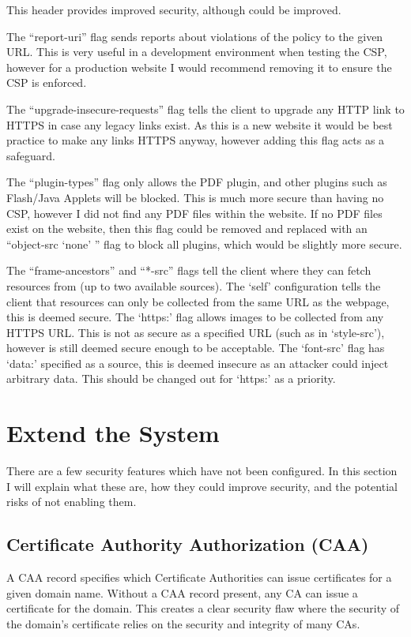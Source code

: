 \documentclass[12pt]{article}
\begin{document}
  This header provides improved security, although could be improved.

  The ``report-uri'' flag sends reports about violations of the policy to the given URL.
  This is very useful in a development environment when testing the CSP, however for a production website I would recommend removing it to ensure the CSP is enforced.

  The ``upgrade-insecure-requests'' flag tells the client to upgrade any HTTP link to HTTPS in case any legacy links exist.
  As this is a new website it would be best practice to make any links HTTPS anyway, however adding this flag acts as a safeguard.

  The ``plugin-types'' flag only allows the PDF plugin, and other plugins such as Flash/Java Applets will be blocked.
  This is much more secure than having no CSP, however I did not find any PDF files within the website.
  If no PDF files exist on the website, then this flag could be removed and replaced with an ``object-src `none' '' flag to block all plugins, which would be slightly more secure.

  The ``frame-ancestors'' and ``*-src'' flags tell the client where they can fetch resources from (up to two available sources).
  The `self' configuration tells the client that resources can only be collected from the same URL as the webpage, this is deemed secure.
  The `https:' flag allows images to be collected from any HTTPS URL.
  This is not as secure as a specified URL (such as in `style-src'), however is still deemed secure enough to be acceptable.
  The `font-src' flag has `data:' specified as a source, this is deemed insecure as an attacker could inject arbitrary data.
  This should be changed out for `https:' as a priority.

  \section{Extend the System}

  There are a few security features which have not been configured.
  In this section I will explain what these are, how they could improve security, and the potential risks of not enabling them.

  \subsection{Certificate Authority Authorization (CAA)}
  A CAA record specifies which Certificate Authorities can issue certificates for a given domain name.
  Without a CAA record present, any CA can issue a certificate for the domain.
  This creates a clear security flaw where the security of the domain's certificate relies on the security and integrity of many CAs.
  
\end{document}
